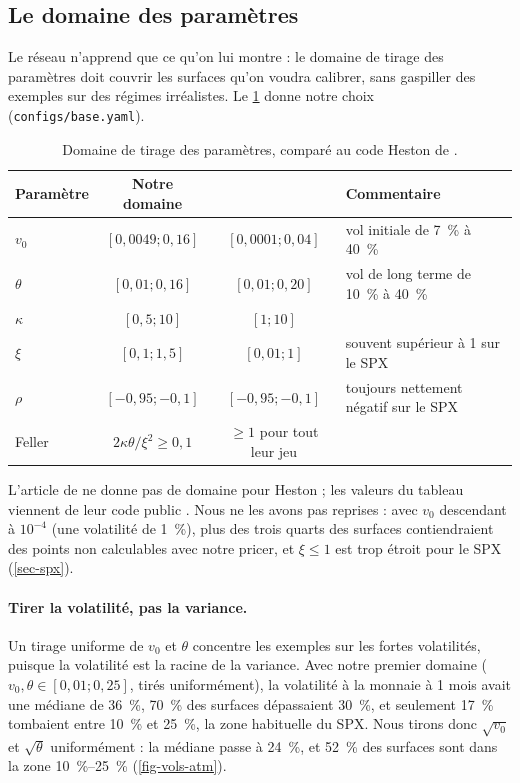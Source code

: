 \subsection{Le domaine des paramètres}
\label{sec-plages}

Le réseau n'apprend que ce qu'on lui montre : le domaine de tirage des paramètres doit couvrir les surfaces qu'on
voudra calibrer, sans gaspiller des exemples sur des régimes irréalistes. Le \cref{tab-plages} donne notre choix
(\texttt{configs/base.yaml}).

\begin{table}[H]
  \centering
  \caption{Domaine de tirage des paramètres, comparé au code Heston de \citet{horvath2021}.}
  \label{tab-plages}
  \small
  \begin{tabular}{lccl}
    \toprule
    Paramètre & Notre domaine & \citet{horvath2021} & Commentaire \\
    \midrule
    $v_0$      & $[0{,}0049 ; 0{,}16]$ & $[0{,}0001 ; 0{,}04]$ & vol initiale de \SI{7}{\percent} à \SI{40}{\percent} \\
    $\theta$   & $[0{,}01 ; 0{,}16]$   & $[0{,}01 ; 0{,}20]$   & vol de long terme de \SI{10}{\percent} à \SI{40}{\percent} \\
    $\kappa$   & $[0{,}5 ; 10]$        & $[1 ; 10]$            & \\
    $\xi$      & $[0{,}1 ; 1{,}5]$     & $[0{,}01 ; 1]$        & souvent supérieur à 1 sur le SPX \\
    $\rho$     & $[-0{,}95 ; -0{,}1]$  & $[-0{,}95 ; -0{,}1]$  & toujours nettement négatif sur le SPX \\
    Feller     & $2\kappa\theta/\xi^2 \geq 0{,}1$ & $\geq 1$ pour tout leur jeu & \\
    \bottomrule
  \end{tabular}
\end{table}

L'article de \citet{horvath2021} ne donne pas de domaine pour Heston ; les valeurs du tableau viennent de leur code
public \citep{horvathcode}. Nous ne les avons pas reprises : avec $v_0$ descendant à $10^{-4}$ (une volatilité de
\SI{1}{\percent}), plus des trois quarts des surfaces contiendraient des points non calculables avec notre pricer, et
$\xi \leq 1$ est trop étroit pour le SPX (\cref{sec-spx}).

\paragraph{Tirer la volatilité, pas la variance.} Un tirage uniforme de $v_0$ et $\theta$ concentre les exemples
sur les fortes volatilités, puisque la volatilité est la racine de la variance. Avec notre premier domaine
($v_0, \theta \in [0{,}01 ; 0{,}25]$, tirés uniformément), la volatilité à la monnaie à 1 mois avait une médiane de
\SI{36}{\percent}, \SI{70}{\percent} des surfaces dépassaient \SI{30}{\percent}, et seulement \SI{17}{\percent}
tombaient entre \SI{10}{\percent} et \SI{25}{\percent}, la zone habituelle du SPX. Nous tirons donc
$\sqrt{v_0}$ et $\sqrt{\theta}$ uniformément : la médiane passe à \SI{24}{\percent}, et \SI{52}{\percent} des
surfaces sont dans la zone \SIrange{10}{25}{\percent} (\cref{fig-vols-atm}).

